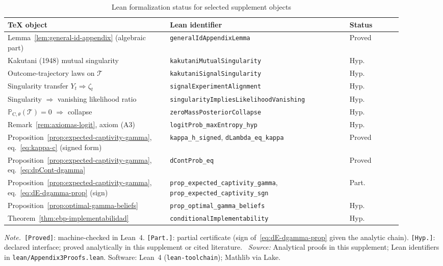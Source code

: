 \documentclass[ecta,nameyear,final,supplement]{econsocart}
\numberwithin{equation}{section}
\numberwithin{table}{section}
\theoremstyle{definition}
\newcommand{\ProbC}[1]{\mathbb{P}_{\mathrm{C},#1}}
\newcommand{\tabnote}{\par\addvspace{0.4em}\noindent\emph{Note.}}
\newcommand{\tabsource}{\ \textit{Source:} Analytical proofs in this supplement;
  Lean identifiers in \texttt{lean/Appendix3Proofs.lean}. Software: Lean~4
  (\texttt{lean-toolchain}); Mathlib via Lake.}
\begin{document}
\begin{table}[htbp]
\centering
\scriptsize
\caption{Lean formalization status for selected supplement objects}
\label{tab:lean-status}
\setlength{\tabcolsep}{3pt}
\renewcommand{\arraystretch}{1.15}
\begin{tabular}{@{}%
  >{\raggedright\arraybackslash}p{0.37\linewidth}%
  >{\raggedright\arraybackslash}p{0.41\linewidth}%
  >{\raggedright\arraybackslash}p{0.12\linewidth}@{}}
\toprule
TeX object & Lean identifier & Status \\
\midrule
Lemma~\ref{lem:general-id-appendix} (algebraic part)
  & \texttt{generalIdAppendix\-Lemma} & Proved \\
Kakutani (1948) mutual singularity
  & \texttt{kakutani\-Mutual\-Singularity} & Hyp. \\
Outcome-trajectory laws on $\mathcal{T}$
  & \texttt{kakutani\-Signal\-Singularity} & Hyp. \\
Singularity transfer $Y_t\Rightarrow\zeta_t$
  & \texttt{signal\-Experiment\-Alignment} & Hyp. \\
Singularity $\Rightarrow$ vanishing likelihood ratio
  & \texttt{singularity\-Implies\-Likelihood\-Vanishing} & Hyp. \\
$\ProbC{\theta}(\mathcal{T})=0$ $\Rightarrow$ collapse
  & \texttt{zeroMass\-Posterior\-Collapse} & Hyp. \\
Remark~\ref{rem:axiomas-logit}, axiom (A3)
  & \texttt{logitProb\-\_max\-Entropy\-\_hyp} & Hyp. \\
Proposition~\ref{prop:expected-captivity-gamma}, eq.~\eqref{eq:kappa-c}
  (signed form)
  & \texttt{kappa\_h\_signed}, \texttt{dLambda\_eq\_kappa} & Proved \\
Proposition~\ref{prop:expected-captivity-gamma}, eq.~\eqref{eq:dpCont-dgamma}
  & \texttt{dContProb\_eq} & Proved \\
Proposition~\ref{prop:expected-captivity-gamma}, eq.~\eqref{eq:dE-dgamma-prop}
  (sign)
  & \texttt{prop\-\_expected\-\_captivity\-\_gamma},
    \texttt{prop\-\_expected\-\_captivity\-\_sgn} & Part. \\
Proposition~\ref{prop:optimal-gamma-beliefs}
  & \texttt{prop\-\_optimal\-\_gamma\-\_beliefs} & Hyp. \\
Theorem~\ref{thm:ebp-implementabilidad}
  & \texttt{conditional\-Implementability} & Hyp. \\
\bottomrule
\end{tabular}
\tabnote\ \texttt{[Proved]}: machine-checked in Lean~4. \texttt{[Part.]}:
partial certificate (sign of~\eqref{eq:dE-dgamma-prop} given the analytic
chain). \texttt{[Hyp.]}: declared interface; proved analytically in this
supplement or cited literature.
\tabsource
\end{table}
\end{document}
